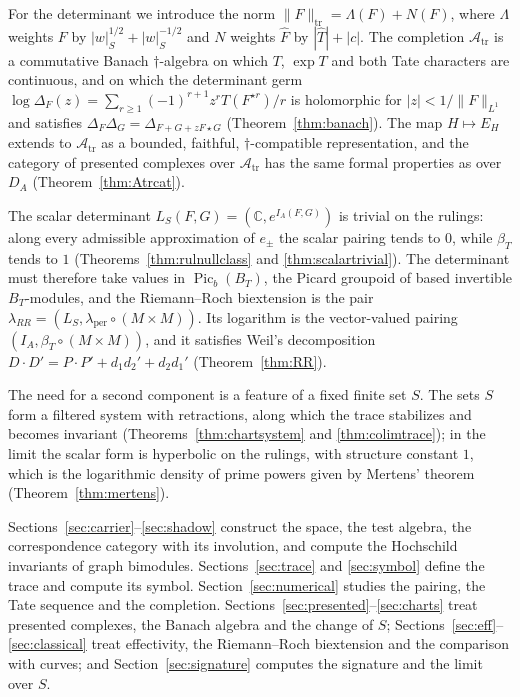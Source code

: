 \documentclass[11pt]{amsart}
\theoremstyle{definition}
\theoremstyle{remark}
\newcommand{\C}{\mathbb C}
\newcommand{\Picb}{\operatorname{Pic}_{b}}
\newcommand{\Atr}{\mathcal A_{\mathrm{tr}}}
\begin{document}
For the determinant we introduce the norm
$\lVert F\rVert_{\mathrm{tr}}=\Lambda(F)+N(F)$, where $\Lambda$ weights $F$ by
$|w|_S^{1/2}+|w|_S^{-1/2}$ and $N$ weights $\widehat F$ by $|\widehat
T|+|c|$.  The completion $\Atr$ is a commutative Banach $\dagger$-algebra on
which $T$, $\exp T$ and both Tate characters are continuous, and on which the
determinant germ
$\log\Delta_F(z)=\sum_{r\ge1}(-1)^{r+1}z^{r}T(F^{\star r})/r$ is holomorphic
for $|z|<1/\lVert F\rVert_{L^1}$ and satisfies
$\Delta_F\Delta_G=\Delta_{F+G+zF\star G}$ (Theorem~\ref{thm:banach}).  The
map $H\mapsto E_H$ extends to $\Atr$ as a bounded, faithful,
$\dagger$-compatible representation, and the category of presented complexes
over $\Atr$ has the same formal properties as over $D_A$
(Theorem~\ref{thm:Atrcat}).

The scalar determinant $L_S(F,G)=(\C,e^{I_A(F,G)})$ is trivial on the
rulings: along every admissible approximation of $e_{\pm}$ the scalar pairing
tends to $0$, while $\beta_T$ tends to $1$ (Theorems~\ref{thm:rulnullclass}
and \ref{thm:scalartrivial}).  The determinant must therefore take values in
$\Picb(B_T)$, the Picard groupoid of based invertible $B_T$-modules, and the
Riemann--Roch biextension is the pair
$\lambda_{RR}=(L_S,\lambda_{\mathrm{per}}\circ(M\times M))$.  Its logarithm is
the vector-valued pairing $(I_A,\beta_T\circ(M\times M))$, and it satisfies
Weil's decomposition $D\cdot D'=P\cdot P'+d_1d_2'+d_2d_1'$
(Theorem~\ref{thm:RR}).

The need for a second component is a feature of a fixed finite set $S$.  The
sets $S$ form a filtered system with retractions, along which the trace
stabilizes and becomes invariant (Theorems~\ref{thm:chartsystem} and
\ref{thm:colimtrace}); in the limit the scalar form is hyperbolic on the
rulings, with structure constant $1$, which is the logarithmic density of
prime powers given by Mertens' theorem (Theorem~\ref{thm:mertens}).

Sections~\ref{sec:carrier}--\ref{sec:shadow} construct the space, the test
algebra, the correspondence category with its involution, and compute the
Hochschild invariants of graph bimodules.  Sections~\ref{sec:trace} and
\ref{sec:symbol} define the trace and compute its symbol.
Section~\ref{sec:numerical} studies the pairing, the Tate sequence and the
completion.  Sections~\ref{sec:presented}--\ref{sec:charts} treat presented
complexes, the Banach algebra and the change of $S$;
Sections~\ref{sec:eff}--\ref{sec:classical} treat effectivity, the
Riemann--Roch biextension and the comparison with curves; and
Section~\ref{sec:signature} computes the signature and the limit over $S$.
\end{document}
